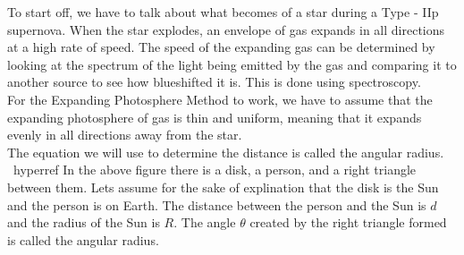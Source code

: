 To start off, we have to talk about what becomes of a star during a Type - IIp supernova.
When the star explodes, an envelope of gas expands in all directions at a high rate of speed.
The speed of the expanding gas can be determined by looking at the spectrum of the light being 
emitted by the gas and comparing it to another source to see how blueshifted it is. This is done 
using spectroscopy. 
\\
For the Expanding Photosphere Method to work, we have to assume that the expanding photosphere of gas 
is thin and uniform, meaning that it expands evenly in all directions away from the star.
\\
The equation we will use to determine the distance is called the angular radius.
\ hyperref
In the above figure there is a disk, a person, and a right triangle between them.
Lets assume for the sake of explination that the disk is the Sun and the person is on Earth.
The distance between the person and the Sun is $d$ and the radius of the Sun is $R$.
The angle $\theta$ created by the right triangle formed is called the angular radius.